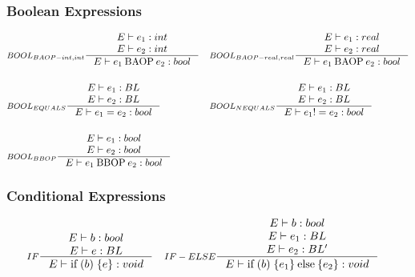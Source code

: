 \subsubsection{Boolean Expressions}
\begin{align*}
&\inference[$BOOL_{BAOP-int,int}$]{E \vdash e_1 : int \\
                       E \vdash e_2 : int}
                    {E \vdash e_1 \mathbin{\textrm{BAOP}} e_2 : bool}
&
&\inference[$BOOL_{BAOP-real,real}$]{E \vdash e_1 : real \\
                       E \vdash e_2 : real}
                    {E \vdash e_1 \mathbin{\textrm{BAOP}} e_2 : bool}
\\\\
&\inference[$BOOL_{EQUALS}$]{E \vdash e_1 : BL \\
                       E \vdash e_2 : BL}
                    {E \vdash e_1 = e_2 : bool}
&
&\inference[$BOOL_{NEQUALS}$]{E \vdash e_1 : BL \\
                       E \vdash e_2 : BL}
                    {E \vdash e_1 != e_2 : bool}
\\\\
&\inference[$BOOL_{BBOP}$]{E \vdash e_1 : bool \\
                       E \vdash e_2 : bool}
                    {E \vdash e_1 \mathbin{\textrm{BBOP}} e_2 : bool}
\end{align*}
\subsubsection{Conditional Expressions}
\begin{align*}
&\inference[$IF$]{E \vdash b : bool \\
                  E \vdash e : BL}
                 {E \vdash \mathbin{\textrm{if}} \; (b) \; \{e\}: void}
&
&\inference[$IF-ELSE$]{E \vdash b : bool \\
                  E \vdash e_1 : BL \\
                  E \vdash e_2 : BL'}
                 {E \vdash \mathbin{\textrm{if}} \; (b) \; \{e_1\} \mathbin{\textrm{else}} \{e_2\}: void}
\end{align*}

